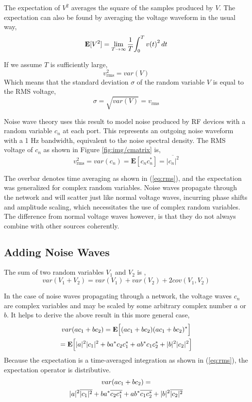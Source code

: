 \documentclass[journal]{IEEEtran}
\begin{document}
The expectation of \(V^2\) averages the square of the samples produced by \(V\). The expectation can also be found by averaging the voltage waveform in the usual way,
\begin{equation}\mathbf{E}[V^2] = \lim_{T\to\infty}{1 \over {T}}{\int _{0}^{T}{v(t)}^{2}\,dt} \label{eq:rms}\end{equation}

If we assume \(T\) is sufficiently large, 
\[v_\textrm{rms}^2 = var(V)\]
Which means that the standard deviation \(\sigma\) of the random variable \(V\) is equal to the RMS voltage,
\[\sigma = \sqrt{var(V)} = v_\textrm{rms}\]

Noise wave theory uses this result to model noise produced by RF devices with a random variable \(c_n\) at each port. This represents an outgoing noise waveform with a 1 Hz bandwidth, equivalent to the noise spectral density. The RMS voltage of \(c_n\) as shown in Figure \ref{fig:img/cmatrix} is,
\[v_\textrm{rms}^2 = var(c_n) = \mathbf{E}[c_n c_n^*] = \overline{|c_n|^2}\]

\texenv\figure[file=img/cmatrix, caption={\small Noise generated by an RF device is modeled as an outgoing wave from each port created by the normal random variable \(c_n\)}., width=3.5in, placement=b!]

The overbar denotes time averaging as shown in (\ref{eq:rms}), and the expectation was generalized for complex random variables. Noise waves propagate through the network and will scatter just like normal voltage waves, incurring phase shifts and amplitude scaling, which necessitates the use of complex random variables. The difference from normal voltage waves however, is that they do not always combine with other sources coherently.


\subsection{Adding Noise Waves}

The sum of two random variables \(V_1\) and \(V_2\) is \cite{b1},
\[var(V_1+V_2) = var(V_1) + var(V_2) + 2cov(V_1,V_2)\]

In the case of noise waves propagating through a network, the voltage waves \(c_n\) are complex variables and may be scaled by some arbitrary complex number \(a\) or \(b\). It helps to derive the above result in this more general case,
\begin{gather}
var(ac_1+bc_2) = \mathbf{E}\Big[(ac_1+bc_2)(ac_1+bc_2)^*\Big] \notag \\
= \mathbf{E}\Big[|a|^2|c_1|^2+ba^*c_2c_1^*+ab^*c_1c_2^*+|b|^2|c_2|^2\Big] \label{eq:var_sum}
\end{gather}
%
Because the expectation is a time-averaged integration as shown in (\ref{eq:rms}), the expectation operator is distributive.
%
\begin{gather}
var(ac_1+bc_2) = \notag\\
|a|^2\overline{|c_1|^2}+ba^*\overline{c_2c_1^*}+ab^*\overline{c_1c_2^*}+|b|^2\overline{|c_2|^2} \label{eq:var_sum1}
\end{gather}
%
\end{document}
